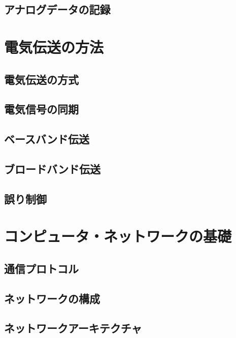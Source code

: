 \documentclass[a4j,12pt]{jreport}
\begin{document}
\chapter{アナログデータの記録}


\part{電気伝送の方法}

\chapter{電気伝送の方式}


\chapter{電気信号の同期}


\chapter{ベースバンド伝送}


\chapter{ブロードバンド伝送}
%

\chapter{誤り制御}


\part{コンピュータ・ネットワークの基礎}

\chapter{通信プロトコル}

\chapter{ネットワークの構成}

\chapter{ネットワークアーキテクチャ}
\end{document}
